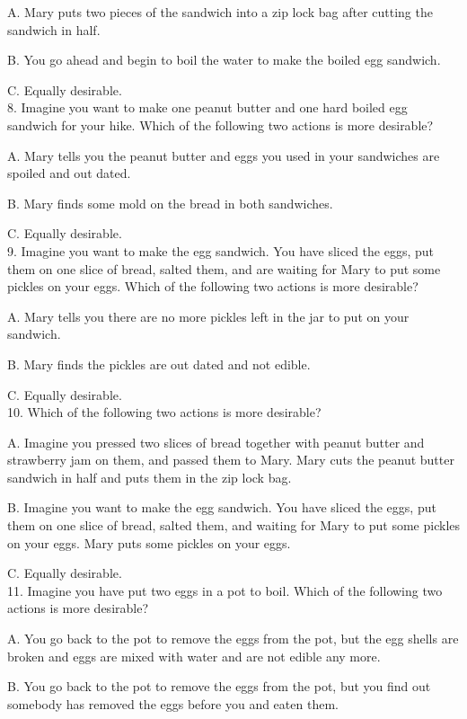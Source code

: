 \documentclass[12pt]{report}
\begin{document}
\begin{appendices}
A. Mary puts two pieces of the sandwich into a zip lock bag after cutting the sandwich in half.

B. You go ahead and begin to boil the water to make the boiled egg sandwich.

C. Equally desirable.\\


8. Imagine you want to make one peanut butter and one hard boiled egg sandwich for your hike. Which of the following two actions is more desirable?

A. Mary tells you the peanut butter and eggs you used in your sandwiches are spoiled and out dated.

B. Mary finds some mold on the bread in both sandwiches.

C. Equally desirable.\\


9. Imagine you want to make the egg sandwich. You have sliced the eggs, put them on one slice of bread, salted them, and are waiting for Mary to put some pickles on your eggs. Which of the following two actions is more desirable?

A. Mary tells you there are no more pickles left in the jar to put on your sandwich.

B. Mary finds the pickles are out dated and not edible.

C. Equally desirable.\\


10. Which of the following two actions is more desirable?

A. Imagine you pressed two slices of bread together with peanut butter and strawberry jam on them, and passed them to Mary. Mary cuts the peanut butter sandwich in half and puts them in the zip lock bag.

B. Imagine you want to make the egg sandwich. You have sliced the eggs, put them on one slice of bread, salted them, and waiting for Mary to put some pickles on your eggs. Mary puts some pickles on your eggs.

C. Equally desirable.\\



11. Imagine you have put two eggs in a pot to boil. Which of the following two actions is more desirable?

A. You go back to the pot to remove the eggs from the pot, but the egg shells are broken and eggs are mixed with water and are not edible any more.

B. You go back to the pot to remove the eggs from the pot, but you find out somebody has removed the eggs before you and eaten them.


\end{appendices}
\end{document}
